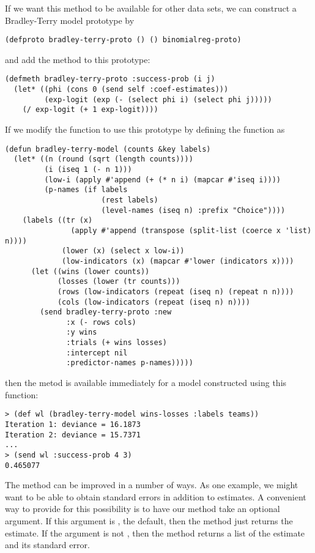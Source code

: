If we want this method to be available for other data sets, we can
construct a Bradley-Terry model prototype by
\begin{verbatim}
(defproto bradley-terry-proto () () binomialreg-proto)
\end{verbatim}
and add the  method to this prototype:
\begin{verbatim}
(defmeth bradley-terry-proto :success-prob (i j)
  (let* ((phi (cons 0 (send self :coef-estimates)))
         (exp-logit (exp (- (select phi i) (select phi j)))))
    (/ exp-logit (+ 1 exp-logit))))
\end{verbatim}
If we modify the  function to use this prototype
by defining the function as
\begin{verbatim}
(defun bradley-terry-model (counts &key labels)
  (let* ((n (round (sqrt (length counts))))
         (i (iseq 1 (- n 1)))
         (low-i (apply #'append (+ (* n i) (mapcar #'iseq i))))
         (p-names (if labels
                      (rest labels) 
                      (level-names (iseq n) :prefix "Choice"))))
    (labels ((tr (x)
               (apply #'append (transpose (split-list (coerce x 'list) n))))
             (lower (x) (select x low-i))
             (low-indicators (x) (mapcar #'lower (indicators x))))
      (let ((wins (lower counts))
            (losses (lower (tr counts)))
            (rows (low-indicators (repeat (iseq n) (repeat n n))))
            (cols (low-indicators (repeat (iseq n) n))))
        (send bradley-terry-proto :new
              :x (- rows cols)
              :y wins
              :trials (+ wins losses)
              :intercept nil
              :predictor-names p-names)))))
\end{verbatim}
then the  metod is available immediately for a
model constructed using this function:
\begin{verbatim}
> (def wl (bradley-terry-model wins-losses :labels teams))
Iteration 1: deviance = 16.1873
Iteration 2: deviance = 15.7371
...
> (send wl :success-prob 4 3)
0.465077
\end{verbatim}

The  method can be improved in a number of ways.
As one example, we might want to be able to obtain standard errors in
addition to estimates. A convenient way to provide for this
possibility is to have our method take an optional argument. If this
argument is , the default, then the method just returns the
estimate. If the argument is not , then the method returns
a list of the estimate and its standard error. 

